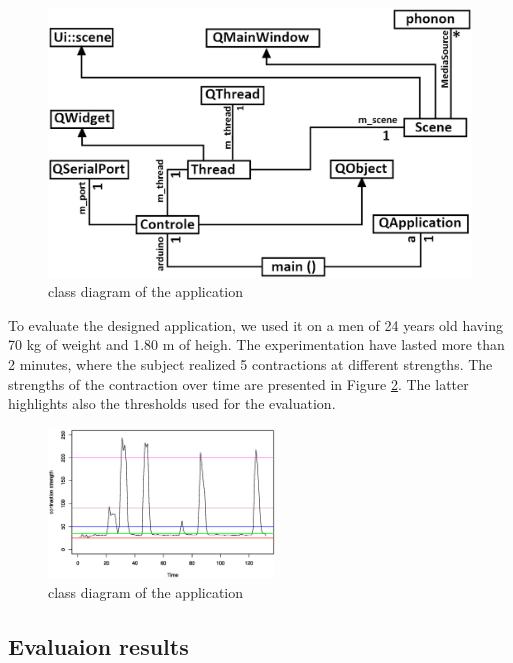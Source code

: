\documentclass[conference]{IEEEtran}
\begin{document}
\begin{figure}[!hb]
    \includegraphics[scale=0.30]{Images/app3.eps}
    \caption{class diagram of the application}
    \label{fig:diagram}
\end{figure}

To evaluate the designed application, we used it on a men of 24 years old having 70 kg of weight and 1.80 m of heigh. The experimentation have lasted more than 2 minutes, where the subject realized 5 contractions at different strengths. The strengths of the contraction over time are presented in Figure \ref{fig:contractionsGraph}. The latter highlights also the thresholds used for the evaluation.

\begin{figure}[t]
\begin{center}
    \includegraphics[width=6cm, height=4cm]{Images/contractions.eps}
    \caption{class diagram of the application}
    \label{fig:contractionsGraph}
\end{center}
\end{figure}


\subsection{Evaluaion results}
\end{document}
